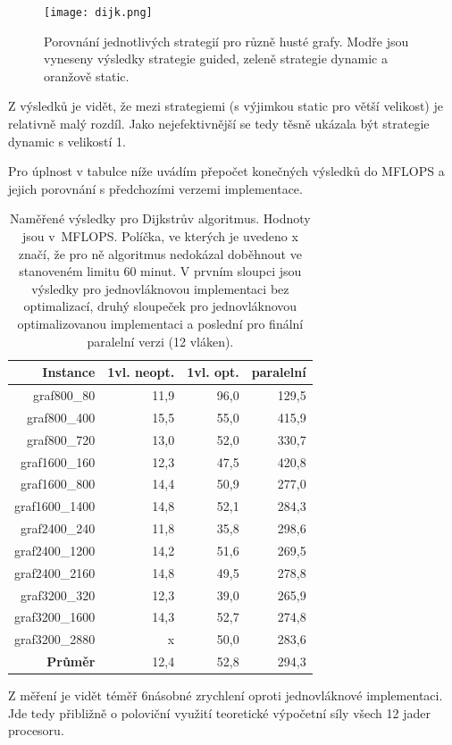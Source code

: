 \documentclass[a4paper,11pt]{article}
\begin{document}
\begin{figure}[H]
  \begin{center}
    \texttt{[image: dijk.png]}
  \end{center}
  \caption{Porovnání jednotlivých strategií pro různě husté grafy. Modře jsou vyneseny výsledky strategie guided, zeleně strategie dynamic a oranžově static.}\label{graf:fig7}
\end{figure}

Z výsledků je vidět, že mezi strategiemi (s výjimkou static pro větší velikost) je relativně malý rozdíl. Jako nejefektivnější se tedy těsně ukázala být strategie dynamic s velikostí 1.
\par
Pro úplnost v tabulce níže uvádím přepočet konečných výsledků do MFLOPS a jejich porovnání s předchozími verzemi implementace.

\begin{table}[H]
  \begin{center}
      \begin{tabular}{|r|r|r|r|}
      \hline
      Instance  	& 1vl. neopt.   & 1vl. opt. & paralelní\\ \hline
      graf800\_80  	& 11,9  & 96,0 & 129,5 \\ \hline
      graf800\_400     	& 15,5  & 55,0 & 415,9 \\ \hline
      graf800\_720  	& 13,0  & 52,0 & 330,7 \\ \hline
      graf1600\_160    	& 12,3  & 47,5 & 420,8\\ \hline
      graf1600\_800  	& 14,4  & 50,9 & 277,0 \\ \hline
      graf1600\_1400   	& 14,8  & 52,1 & 284,3 \\ \hline
      graf2400\_240  	& 11,8  & 35,8 & 298,6 \\ \hline
      graf2400\_1200   	& 14,2  & 51,6 & 269,5 \\ \hline
      graf2400\_2160  	& 14,8  & 49,5 & 278,8 \\ \hline
      graf3200\_320    	& 12,3  & 39,0 & 265,9 \\ \hline
      graf3200\_1600  	& 14,3  & 52,7 & 274,8 \\ \hline
      graf3200\_2880   	& x    	& 50,0 & 283,6 \\ \hline
      \textbf{Průměr}	& 12,4  & 52,8 & 294,3 \\ \hline
      \end{tabular}
  \caption{Naměřené výsledky pro Dijkstrův algoritmus. Hodnoty jsou v~MFLOPS. Políčka, ve kterých je uvedeno x značí, že pro ně algoritmus nedokázal doběhnout ve stanoveném limitu 60 minut. V prvním sloupci jsou výsledky pro jednovláknovou implementaci bez optimalizací, druhý sloupeček pro jednovláknovou optimalizovanou implementaci a poslední pro finální paralelní verzi (12 vláken).}
  \label{tab:dijkstra2}
  \end{center}
\end{table}
Z měření je vidět téměř 6násobné zrychlení oproti jednovláknové implementaci. Jde tedy přibližně o poloviční využití teoretické výpočetní síly všech 12 jader procesoru.
\end{document}
